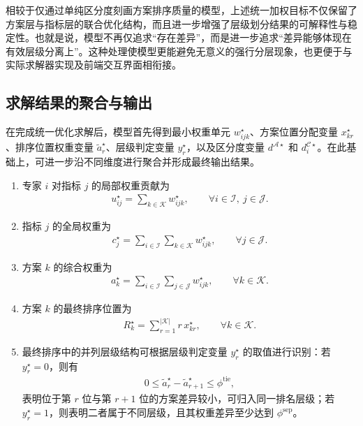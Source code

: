 \documentclass{article}
\begin{document}
相较于仅通过单纯区分度刻画方案排序质量的模型，上述统一加权目标不仅保留了方案层与指标层的联合优化结构，而且进一步增强了层级划分结果的可解释性与稳定性。也就是说，模型不再仅追求“存在差异”，而是进一步追求“差异能够体现在有效层级分离上”。这种处理使模型更能避免无意义的强行分层现象，也更便于与实际求解器实现及前端交互界面相衔接。

\subsection{求解结果的聚合与输出}

在完成统一优化求解后，模型首先得到最小权重单元 $w_{ijk}^{\star}$、方案位置分配变量 $x_{kr}^{\star}$、排序位置权重变量 $\tilde a_r^{\star}$、层级判定变量 $y_r^{\star}$，以及区分度变量 $d^{\mathcal A\star}$ 和 $d_i^{\mathcal C\star}$。在此基础上，可进一步沿不同维度进行聚合并形成最终输出结果。
\begin{enumerate}
    \item 专家 $i$ 对指标 $j$ 的局部权重贡献为
    \begin{align}
        u_{ij}^{\star}=\sum_{k\in\mathcal K} w_{ijk}^{\star},
        \qquad \forall i\in\mathcal I,\ j\in\mathcal J.
    \end{align}

    \item 指标 $j$ 的全局权重为
    \begin{align}
        c_j^{\star}=\sum_{i\in\mathcal I}\sum_{k\in\mathcal K} w_{ijk}^{\star},
        \qquad \forall j\in\mathcal J.
    \end{align}

    \item 方案 $k$ 的综合权重为
    \begin{align}
        a_k^{\star}=\sum_{i\in\mathcal I}\sum_{j\in\mathcal J} w_{ijk}^{\star},
        \qquad \forall k\in\mathcal K.
    \end{align}

    \item 方案 $k$ 的最终排序位置为
    \begin{align}
        R_k^{\star}=\sum_{r=1}^{|\mathcal K|} r\,x_{kr}^{\star},
        \qquad \forall k\in\mathcal K.
    \end{align}

    \item 最终排序中的并列层级结构可根据层级判定变量 $y_r^\star$ 的取值进行识别：若 $y_r^\star=0$，则有
    \begin{align*}
        0\le \tilde a_r^\star-\tilde a_{r+1}^\star\le \phi^{\mathrm{tie}},
    \end{align*}
    表明位于第 $r$ 位与第 $r+1$ 位的方案差异较小，可归入同一排名层级；若 $y_r^\star=1$，则表明二者属于不同层级，且其权重差异至少达到 $\phi^{\mathrm{sep}}$。
\end{enumerate}
\end{document}
